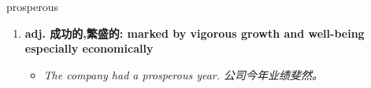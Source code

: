 
\begin{frame}
{\huge prosperous}
\begin{center}
\begin{enumerate}\Large
  \item \textbf{adj. 成功的,繁盛的: marked by vigorous growth and well-being especially economically}
  \begin{itemize}
    \item \em{\Large{The company had a prosperous year. 公司今年业绩斐然。}}
  \end{itemize}
\end{enumerate}
\end{center}
\end{frame}
